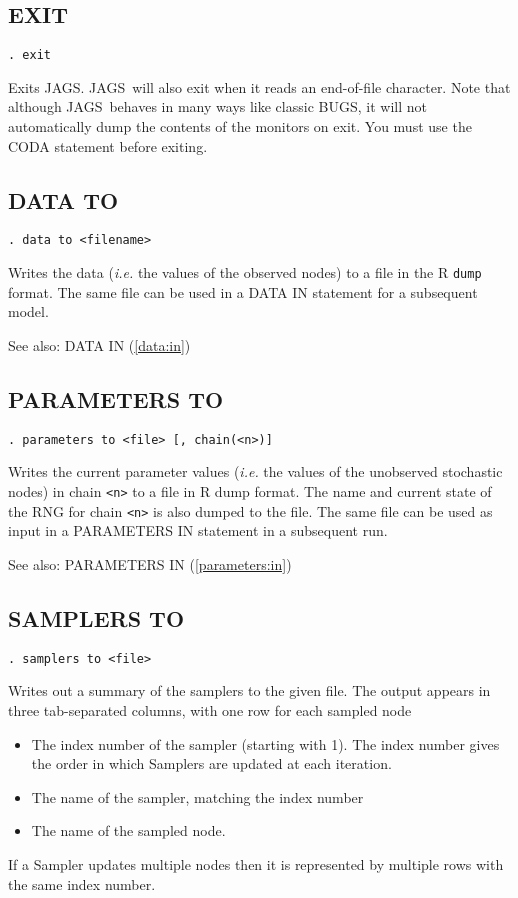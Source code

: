 \documentclass[11pt, a4paper, titlepage]{report}
\newcommand{\JAGS}{\textsf{JAGS}}
\newcommand{\BUGS}{\textsf{BUGS}}
\begin{document}
\subsection{EXIT}

\begin{verbatim}
. exit
\end{verbatim}
Exits \JAGS. \JAGS\ will also exit when it reads an end-of-file character.
Note that although \JAGS\ behaves in many ways like classic \BUGS, it 
will not automatically dump the contents of the monitors on exit. You
must use the CODA statement before exiting.

\subsection{DATA TO}
\label{data:to}
\begin{verbatim}
. data to <filename>
\end{verbatim}
Writes the data ({\em i.e.} the values of the observed nodes) to a
file in the R \texttt{dump} format. The same file can be used in a
DATA IN statement for a subsequent model.

See also: DATA IN (\ref{data:in})

\subsection{PARAMETERS TO}
\label{parameters:to}
\begin{verbatim}
. parameters to <file> [, chain(<n>)]
\end{verbatim}
Writes the current parameter values ({\em i.e.} the values of the
unobserved stochastic nodes) in chain \texttt{<n>} to a file in R dump
format. The name and current state of the RNG for chain \texttt{<n>}
is also dumped to the file.  The same file can be used as input in a
PARAMETERS IN statement in a subsequent run.

See also: PARAMETERS IN (\ref{parameters:in})

\subsection{SAMPLERS TO}
\label{samplers:to}
\begin{verbatim}
. samplers to <file>
\end{verbatim}
Writes out a summary of the samplers to the given file.  The output appears
in three tab-separated columns, with one row for each sampled node
\begin{itemize}
\item The index number of the sampler (starting with 1). The index number 
gives the order in which Samplers are updated at each iteration.
\item The name of the sampler, matching the index number
\item The name of the sampled node. 
\end{itemize}
If a Sampler updates multiple nodes then it is represented by multiple rows
with the same index number.
\end{document}
